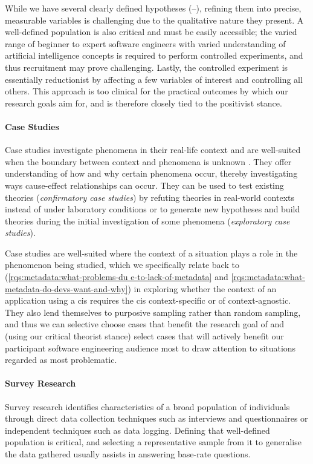 While we have several clearly defined hypotheses (--), refining them into precise, measurable variables is challenging due to the qualitative nature they present. A well-defined population is also critical and must be easily accessible; the varied range of beginner to expert software engineers with varied understanding of artificial intelligence concepts is required to perform controlled experiments, and thus recruitment may prove challenging. Lastly, the controlled experiment is essentially reductionist by affecting a few variables of interest and controlling all others. This approach is too clinical for the practical outcomes by which our research goals aim for, and is therefore closely tied to the positivist stance.

\paragraph{Case Studies}
Case studies investigate phenomena in their real-life context and are well-suited when the boundary between context and phenomena is unknown . They offer understanding of how and why certain phenomena occur, thereby investigating ways cause-effect relationships can occur. They can be used to test existing theories (\textit{confirmatory case studies}) by refuting theories in real-world contexts instead of under laboratory conditions or to generate new hypotheses and build theories during the initial investigation of some phenomena (\textit{exploratory case studies}).

Case studies are well-suited where the context of a situation plays a role in the phenomenon being studied, which we specifically relate back to  (\ref{rqs:metadata:what-problems-du                                                                e-to-lack-of-metadata} and \ref{rqs:metadata:what-metadata-do-devs-want-and-why}) in exploring whether the context of an application using a \gls{cis} requires the \gls{cis} context-specific or of context-agnostic. They also lend themselves to purposive sampling rather than random sampling, and thus we can selective choose cases that benefit the research goal of  and (using our critical theorist stance) select cases that will actively benefit our participant software engineering audience most to draw attention to situations regarded as most problematic.

\paragraph{Survey Research}
Survey research identifies characteristics of a broad population of individuals through direct data collection techniques such as interviews and questionnaires or independent techniques such as data logging. Defining that well-defined population is critical, and selecting a representative sample from it to generalise the data gathered usually assists in answering base-rate questions.

